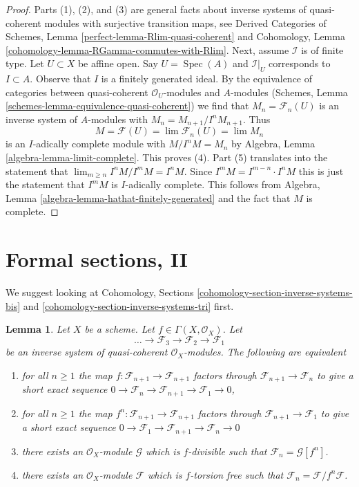 \documentclass{stacks-project}
\theoremstyle{plain}
\newtheorem{lemma}[subsection]{Lemma}
\theoremstyle{definition}
\theoremstyle{remark}
\numberwithin{equation}{subsection}
\def\lim{\mathop{\mathrm{lim}}\nolimits}
\def\Spec{\mathop{\mathrm{Spec}}}
\begin{document}
\begin{proof}
Parts (1), (2), and (3) are general facts about inverse systems of
quasi-coherent modules with surjective transition maps, see
Derived Categories of Schemes, Lemma \ref{perfect-lemma-Rlim-quasi-coherent}
and Cohomology, Lemma \ref{cohomology-lemma-RGamma-commutes-with-Rlim}.
Next, assume $\mathcal{I}$ is of finite type.
Let $U \subset X$ be affine open. Say $U = \Spec(A)$ and $\mathcal{I}|_U$
corresponds to $I \subset A$. Observe that $I$ is a finitely generated ideal.
By the equivalence of categories between quasi-coherent $\mathcal{O}_U$-modules
and $A$-modules (Schemes, Lemma \ref{schemes-lemma-equivalence-quasi-coherent})
we find that $M_n = \mathcal{F}_n(U)$ is an inverse system
of $A$-modules with $M_n = M_{n + 1}/I^nM_{n + 1}$. Thus
$$
M = \mathcal{F}(U) = \lim \mathcal{F}_n(U) = \lim M_n
$$
is an $I$-adically complete module with $M/I^nM = M_n$ by
Algebra, Lemma \ref{algebra-lemma-limit-complete}. This proves (4).
Part (5) translates into the statement that
$\lim_{m \geq n} I^nM/I^mM = I^nM$.
Since $I^mM = I^{m - n} \cdot I^nM$ this is just the statement that
$I^mM$ is $I$-adically complete. This follows from
Algebra, Lemma \ref{algebra-lemma-hathat-finitely-generated}
and the fact that $M$ is complete.
\end{proof}





\section{Formal sections, II}
\label{section-formal-functions-principal}

\noindent
We suggest looking at
Cohomology, Sections
\ref{cohomology-section-inverse-systems-bis} and
\ref{cohomology-section-inverse-systems-tri} first.

\begin{lemma}
\label{lemma-equivalent-f-good}
Let $X$ be a scheme. Let $f \in \Gamma(X, \mathcal{O}_X)$. Let
$$
\ldots \to \mathcal{F}_3 \to \mathcal{F}_2 \to \mathcal{F}_1
$$
be an inverse system of quasi-coherent $\mathcal{O}_X$-modules.
The following are equivalent
\begin{enumerate}
\item for all $n \geq 1$ the map
$f : \mathcal{F}_{n + 1} \to \mathcal{F}_{n + 1}$ factors
through $\mathcal{F}_{n + 1} \to \mathcal{F}_n$ to give a
short exact sequence
$0 \to \mathcal{F}_n \to \mathcal{F}_{n + 1} \to \mathcal{F}_1 \to 0$,
\item for all $n \geq 1$ the map
$f^n : \mathcal{F}_{n + 1} \to \mathcal{F}_{n + 1}$
factors through $\mathcal{F}_{n + 1} \to \mathcal{F}_1$
to give a short exact sequence
$0 \to \mathcal{F}_1 \to \mathcal{F}_{n + 1} \to \mathcal{F}_n \to 0$
\item there exists an $\mathcal{O}_X$-module $\mathcal{G}$
which is $f$-divisible such that $\mathcal{F}_n = \mathcal{G}[f^n]$.
\item there exists an $\mathcal{O}_X$-module $\mathcal{F}$ which is
$f$-torsion free such that $\mathcal{F}_n = \mathcal{F}/f^n\mathcal{F}$.
\end{enumerate}
\end{lemma}
\end{document}
